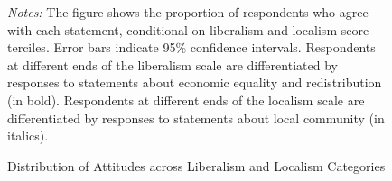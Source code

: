 \documentclass[article,12pt]{memoir}
\begin{document}
\begin{figure}[p]\centering
  \caption{Distribution of Attitudes across Liberalism and Localism Categories}
  \label{fig:hg_e_pc}
  \begin{measuredfigure}
  \end{measuredfigure}
  \begin{tablenotes}[flushleft]
    \item \hspace{-.2em}\emph{Notes:} The figure shows the proportion of respondents who agree with each statement, conditional on liberalism and localism score terciles.  Error bars indicate 95\% confidence intervals. Respondents at different ends of the liberalism scale are differentiated by responses to statements about economic equality and redistribution (in bold). Respondents at different ends of the localism scale are differentiated by responses to statements about local community (in italics). 
  \end{tablenotes}
\end{figure}
\end{document}

